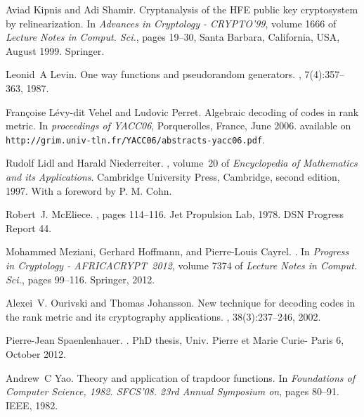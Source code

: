 \documentclass[11pt, a4paper]{llncs}
\begin{document}
\begin{thebibliography}{10}
Aviad Kipnis and Adi Shamir.
\newblock Cryptanalysis of the {HFE} public key cryptosystem by
  relinearization.
\newblock In {\em Advances in Cryptology - CRYPTO'99}, volume 1666 of {\em
  Lecture Notes in Comput. Sci.}, pages 19--30, Santa Barbara, California, USA,
  August 1999. Springer.

Leonid~A Levin.
\newblock One way functions and pseudorandom generators.
, 7(4):357--363, 1987.

Fran{\c{c}}oise L{\'{e}}vy-dit Vehel and Ludovic Perret.
\newblock Algebraic decoding of codes in rank metric.
\newblock In {\em proceedings of YACC06}, Porquerolles, France, June 2006.
\newblock available on {\tt
  http://grim.univ-tln.fr/YACC06/abstracts-yacc06.pdf}.

Rudolf Lidl and Harald Niederreiter.
, volume~20 of {\em Encyclopedia of Mathematics
  and its Applications}.
\newblock Cambridge University Press, Cambridge, second edition, 1997.
\newblock With a foreword by P. M. Cohn.

Robert~J. McEliece.
, pages
  114--116.
\newblock Jet Propulsion Lab, 1978.
\newblock DSN Progress Report 44.

Mohammed Meziani, Gerhard Hoffmann, and Pierre-Louis Cayrel.
.
\newblock In {\em Progress in Cryptology - AFRICACRYPT~2012}, volume 7374 of
  {\em Lecture Notes in Comput. Sci.}, pages 99--116. Springer, 2012.

Alexei~V. Ourivski and Thomas Johansson.
\newblock New technique for decoding codes in the rank metric and its
  cryptography applications.
, 38(3):237--246, 2002.

Pierre-Jean Spaenlenhauer.
.
\newblock PhD thesis, Univ. Pierre et Marie Curie- Paris 6, October 2012.

Andrew~C Yao.
\newblock Theory and application of trapdoor functions.
\newblock In {\em Foundations of Computer Science, 1982. SFCS'08. 23rd Annual
  Symposium on}, pages 80--91. IEEE, 1982.

\end{thebibliography}
\end{document}
